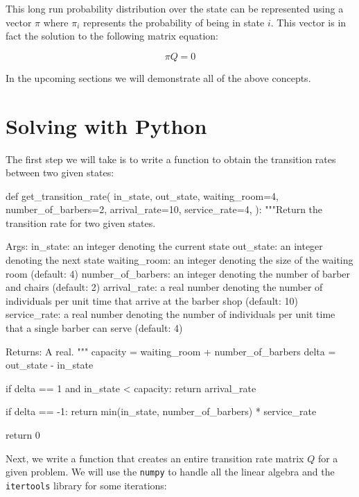 This long run probability distribution over the state can be represented using a
vector \(\pi\) where \(\pi_i\) represents the probability of being in state
\(i\). This vector is in fact the solution to the following matrix equation:

\begin{equation}
    \pi Q = 0
    \label{eqn:continuous_time_markov_process_steady_state}
\end{equation}

In the upcoming sections we will demonstrate all of the above concepts.

\section{Solving with Python}\label{sec:solving-with-python}

The first step we will take is to write a function to obtain the transition
rates between two given states:


\begin{pyin}
def get_transition_rate(
    in_state,
    out_state,
    waiting_room=4,
    number_of_barbers=2,
    arrival_rate=10,
    service_rate=4,
):
    """Return the transition rate for two given states.

    Args:
        in_state: an integer denoting the current state
        out_state: an integer denoting the next state
        waiting_room: an integer denoting the size of the
                      waiting room (default: 4)
        number_of_barbers: an integer denoting the number of
                           barber and chairs (default: 2)
        arrival_rate: a real number denoting the number of
                      individuals per unit time that arrive at
                      the barber shop (default: 10)
        service_rate: a real number denoting the number of
                      individuals per unit time that a single
                      barber can serve (default: 4)

    Returns:
        A real.
    """
    capacity = waiting_room + number_of_barbers
    delta = out_state - in_state

    if delta == 1 and in_state < capacity:
        return arrival_rate

    if delta == -1:
        return min(in_state, number_of_barbers) * service_rate

    return 0
\end{pyin}

Next, we write a function that creates an entire transition rate matrix \(Q\)
for a given problem. We will use the \texttt{numpy} to handle all
the linear algebra and the \texttt{itertools} library for some
iterations:

